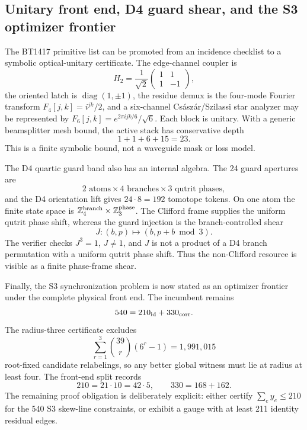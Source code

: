 \subsection{Unitary front end, D4 guard shear, and the S3 optimizer frontier}
\label{sec:bt1419-bt1421-frontier}

The BT1417 primitive list can be promoted from an incidence checklist to a
symbolic optical-unitary certificate.  The edge-channel coupler is
\[
H_2=\frac1{\sqrt2}\begin{pmatrix}1&1\\1&-1\end{pmatrix},
\]
the oriented latch is \(\operatorname{diag}(1,\pm1)\), the residue demux is the
four-mode Fourier transform \(F_4[j,k]=i^{jk}/2\), and a six-channel
Cs\'asz\'ar/Szilassi star analyzer may be represented by
\(F_6[j,k]=e^{2\pi ijk/6}/\sqrt6\).  Each block is unitary.  With a generic
beamsplitter mesh bound, the active stack has conservative depth
\[
1+1+6+15=23.
\]
This is a finite symbolic bound, not a waveguide mask or loss model.

The D4 quartic guard band also has an internal algebra.  The 24 guard apertures
are
\[
2\text{ atoms}\times4\text{ branches}\times3\text{ qutrit phases},
\]
and the D4 orientation lift gives \(24\cdot8=192\) tomotope tokens.  On one
atom the finite state space is \(\mathbb Z_4^{\rm branch}\times\mathbb Z_3^{\rm phase}\).
The Clifford frame supplies the uniform qutrit phase shift, whereas the guard
injection is the branch-controlled shear
\[
J:(b,p)\longmapsto (b,p+b\bmod3).
\]
The verifier checks \(J^3=1\), \(J\ne1\), and \(J\) is not a product of a D4
branch permutation with a uniform qutrit phase shift.  Thus the non-Clifford
resource is visible as a finite phase-frame shear.

Finally, the S3 synchronization problem is now stated as an optimizer frontier
under the complete physical front end.  The incumbent remains
\[
540=210_{\rm id}+330_{\rm corr}.
\]
The radius-three certificate excludes
\[
\sum_{r=1}^3\binom{39}{r}(6^r-1)=1,991,015
\]
root-fixed candidate relabelings, so any better global witness must lie at
radius at least four.  The front-end split records
\[
210=21\cdot10=42\cdot5,
\qquad
330=168+162.
\]
The remaining proof obligation is deliberately explicit: either certify
\(\sum_e y_e\le210\) for the 540 S3 skew-line constraints, or exhibit a gauge
with at least 211 identity residual edges.
